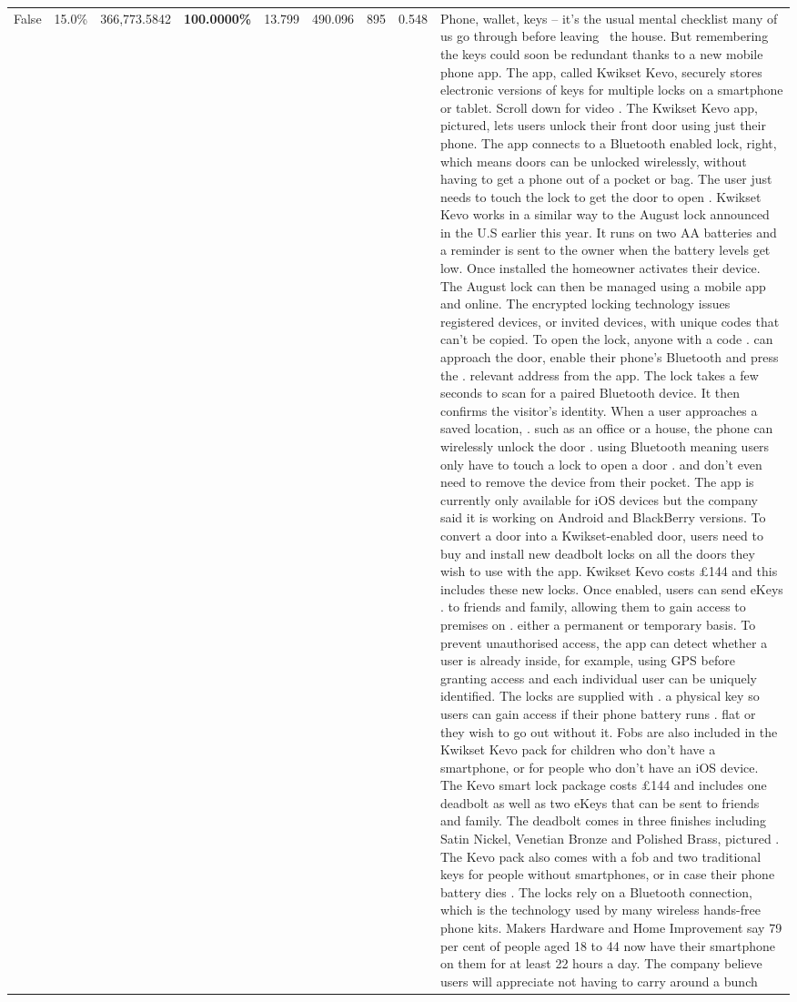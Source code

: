 \begin{table}[H]
\begin{tabular}{lllrlllll}
False & 15.0\% & 366,773.5842 & \bfseries \color{red} 100.0000\% & 13.799 & 490.096 & 895 & 0.548 & Phone, wallet, keys – it’s the usual mental checklist many of us go through before leaving  the house. But remembering the keys could soon be redundant thanks to a new mobile phone app. The app, called Kwikset Kevo, securely stores electronic versions of keys for multiple locks on a smartphone or tablet. Scroll down for video . The Kwikset Kevo app, pictured, lets users unlock their front door using just their phone. The app connects to a Bluetooth enabled lock, right, which means doors can be unlocked wirelessly, without having to get a phone out of a pocket or bag. The user just needs to touch the lock to get the door to open . Kwikset Kevo works in a similar way to the August lock announced in the U.S earlier this year. It runs on two AA batteries and a reminder is sent to the owner when the battery levels get low. Once installed the homeowner activates their device. The August lock can then be managed using a mobile app and online. The encrypted locking technology issues registered devices, or invited devices, with unique codes that can't be copied. To open the lock, anyone with a code . can approach the door, enable their phone's Bluetooth and press the . relevant address from the app. The lock takes a few seconds to scan for a paired Bluetooth device. It then confirms the visitor's identity. When a user approaches a saved location, . such as an office or a house, the phone can wirelessly unlock the door . using Bluetooth meaning users only have to touch a lock to open a door . and don't even need to remove the device from their pocket. The app is currently only available for iOS devices but the company said it is working on Android and BlackBerry versions. To convert a door into a Kwikset-enabled door, users need to buy and install new deadbolt locks on all the doors they wish to use with the app. Kwikset Kevo costs £144 and this includes these new locks. Once enabled, users can send eKeys . to friends and family, allowing them to gain access to premises on . either a permanent or temporary basis. To prevent unauthorised access, the app can detect whether a user is already inside, for example, using GPS before granting access and each individual user can be uniquely identified. The locks are supplied with . a physical key so users can gain access if their phone battery runs . flat or they wish to go out without it. Fobs are also included in the Kwikset Kevo pack for children who don't have a smartphone, or for people who don't have an iOS device. The Kevo smart lock package costs £144 and includes one deadbolt as well as two eKeys that can be sent to friends and family. The deadbolt comes in three finishes including Satin Nickel, Venetian Bronze and Polished Brass, pictured . The Kevo pack also comes with a fob and two traditional keys for people without smartphones, or in case their phone battery dies . The locks rely on a Bluetooth connection, which is the technology used by many wireless hands-free phone kits. Makers Hardware and Home Improvement say 79 per cent of people aged 18 to 44 now have their smartphone on them for at least 22 hours a day. The company believe users will appreciate not having to carry around a bunch 
\end{tabular}
\end{table}
